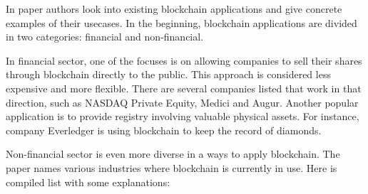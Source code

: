 \documentclass[conference,compsoc]{IEEEtran}
\begin{document}
In paper \cite{beyond} authors look into existing blockchain applications and give concrete examples of their usecases.
In the beginning, blockchain applications are divided in two categories: financial and non-financial.

In financial sector, one of the focuses is on allowing companies to sell their shares through blockchain directly to the public. 
This approach is considered less expensive and more flexible. 
There are several companies listed that work in that direction, such as NASDAQ Private Equity, Medici and Augur.
Another popular application is to provide registry involving valuable physical assets. 
For instance, company Everledger is using blockchain to keep the record of diamonds.

Non-financial sector is even more diverse in a ways to apply blockchain.
The paper \cite{beyond} names various industries where blockchain is currently in use. 
Here is compiled list with some explanations:
\end{document}
